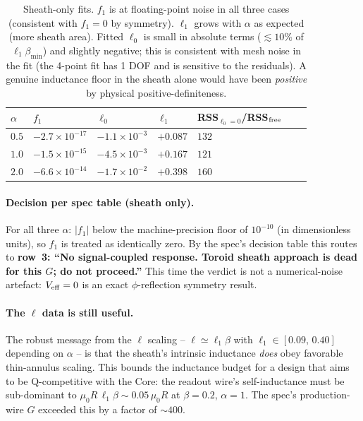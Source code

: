 \documentclass[11pt]{article}
\begin{document}
\begin{table}[h]
\centering
\begin{tabular}{lllllll}\toprule
$\alpha$ & $f_1$ & $\ell_0$ & $\ell_1$ & RSS$_{\ell_0=0}$/RSS$_{\rm free}$ \\\midrule
$0.5$ & $-2.7\times 10^{-17}$ & $-1.1\!\times\!10^{-3}$ & $+0.087$ & $132$ \\
$1.0$ & $-1.5\times 10^{-15}$ & $-4.5\!\times\!10^{-3}$ & $+0.167$ & $121$ \\
$2.0$ & $-6.6\times 10^{-14}$ & $-1.7\!\times\!10^{-2}$ & $+0.398$ & $160$ \\\bottomrule
\end{tabular}
\caption{Sheath-only fits.  $f_1$ is at floating-point noise in all
three cases (consistent with $f_1=0$ by symmetry).  $\ell_1$ grows
with $\alpha$ as expected (more sheath area).  Fitted $\ell_0$ is
small in absolute terms ($\lesssim 10\%$ of $\ell_1\beta_{\min}$) and
slightly negative; this is consistent with mesh noise in the fit
(the 4-point fit has 1 DOF and is sensitive to the residuals).  A
genuine inductance floor in the sheath alone would have been
\emph{positive} by physical positive-definiteness.}
\label{tab:fits-no-wire}
\end{table}

\paragraph{Decision per spec table (sheath only).}

For all three $\alpha$: $|f_1|$ below the machine-precision floor of
$10^{-10}$ (in dimensionless units), so $f_1$ is treated as
identically zero.  By the spec's decision table this routes to
\textbf{row~3: ``No signal-coupled response.  Toroid sheath approach
is dead for this $G$; do not proceed.''}  This time the verdict is
not a numerical-noise artefact: $V_{\rm eff}=0$ is an exact
$\phi$-reflection symmetry result.

\paragraph{The $\ell$ data is still useful.}

The robust message from the $\ell$ scaling -- $\ell\simeq\ell_1\beta$
with $\ell_1\!\in\![0.09,\,0.40]$ depending on $\alpha$ -- is that the
sheath's intrinsic inductance \emph{does} obey favorable thin-annulus
scaling.  This bounds the inductance budget for a design that aims
to be Q-competitive with the Core: the readout wire's
self-inductance must be sub-dominant to $\mu_0 R\,\ell_1\beta\sim 0.05\,
\mu_0 R$ at $\beta=0.2$, $\alpha=1$.  The spec's production-wire $G$
exceeded this by a factor of $\sim 400$.
\end{document}
